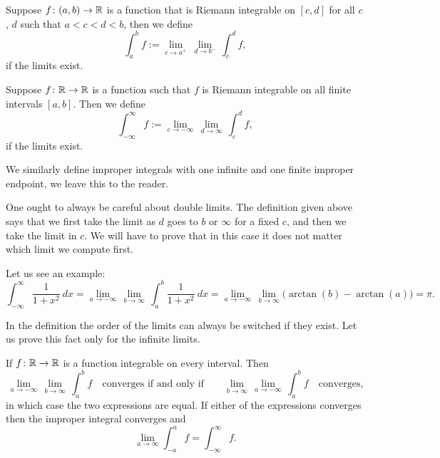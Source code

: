 \begin{defn}
Suppose $f \colon (a,b) \to {\mathbb{R}}$ is a function
that is Riemann integrable on $[c,d]$ for all $c$, $d$
such that $a < c < d < b$, then we define
\begin{equation*}
\int_a^b f := \lim_{c \to a^+} \, \lim_{d \to b^-} \, \int_{c}^{d} f ,
\end{equation*}
if the limits exist.

Suppose $f \colon {\mathbb{R}} \to {\mathbb{R}}$ is a function such that
$f$ is Riemann integrable on all finite intervals $[a,b]$.  Then
we define
\begin{equation*}
\int_{-\infty}^\infty f := \lim_{c \to -\infty} \, \lim_{d \to \infty} \, \int_c^d f ,
\end{equation*}
if the limits exist.

We similarly define improper integrals with one infinite and one finite
improper endpoint, we leave this to the reader.
\end{defn}

One ought to always be careful about double limits.  The definition
given above says that we first take the limit as $d$ goes to $b$ or
$\infty$ for a fixed $c$, and then we take the limit in $c$.
We will have to prove that in this case it does not matter which limit
we compute first.

\begin{example}
Let us see an example:
\begin{equation*}
\int_{-\infty}^\infty \frac{1}{1+x^2} ~ dx
=
\lim_{a \to -\infty} \, \lim_{b \to \infty} \,
\int_{a}^b \frac{1}{1+x^2} ~ dx
=
\lim_{a \to -\infty} \, \lim_{b \to \infty}
\bigl( \arctan(b) - \arctan(a) \bigr)
=
\pi .
\end{equation*}
\end{example}

In the definition the order of the limits can always be switched if they
exist.  Let us prove this fact only for the infinite limits.

\begin{prop}
If $f \colon {\mathbb{R}} \to {\mathbb{R}}$ is a function integrable on every interval.
Then 
\begin{equation*}
\lim_{a \to -\infty} \, \lim_{b \to \infty} \, \int_a^b f
\quad \text{converges if and only if} \qquad
\lim_{b \to \infty}
\,
\lim_{a \to -\infty}
\,
\int_a^b f
\quad
\text{converges,}
\end{equation*}
in which case the two
expressions are equal.  If either of the
expressions converges then the improper integral converges and
\begin{equation*}
\lim_{a\to\infty}
\int_{-a}^a f
=
\int_{-\infty}^\infty f .
\end{equation*}
\end{prop}

